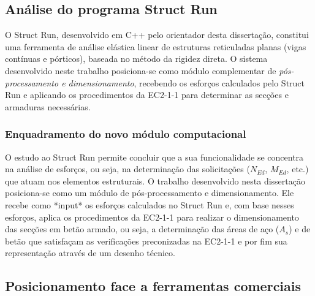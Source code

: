 
\subsection{Análise do programa Struct Run}
O Struct Run, desenvolvido em C++ pelo orientador desta dissertação, constitui uma ferramenta de análise elástica linear de estruturas reticuladas planas (vigas contínuas e pórticos), baseada no método da rigidez direta.
O sistema desenvolvido neste trabalho posiciona-se como módulo complementar de \emph{pós-processamento e dimensionamento}, recebendo os esforços calculados pelo Struct Run e aplicando os procedimentos da EC2-1-1 para determinar as secções e armaduras necessárias.


\subsubsection{Enquadramento do novo módulo computacional}
O estudo ao Struct Run permite concluir que a sua funcionalidade se concentra na análise de esforços, ou seja, na determinação das solicitações ($N_{Ed}$, $M_{Ed}$, etc.) que atuam nos elementos estruturais.
O trabalho desenvolvido nesta dissertação posiciona-se como um módulo de pós-processamento e dimensionamento. Ele recebe como *input* os esforços calculados no Struct Run e, com base nesses esforços, aplica os procedimentos da EC2-1-1 para realizar o dimensionamento das secções em betão armado, ou seja, a determinação das áreas de aço ($A_s$) e de betão que satisfaçam as verificações preconizadas na EC2-1-1 e por fim sua representação através de um desenho técnico.

\subsection{Posicionamento face a ferramentas comerciais}

